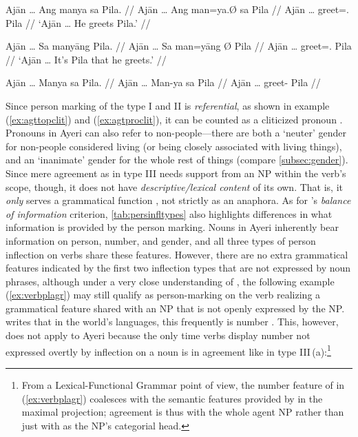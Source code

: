 \pex %
\a\label{ex:agttopclit}\begingl
	\gla Ajān … Ang manya sa Pila. //
	\glb Ajān … Ang man=ya.Ø sa ​Pila //
	\glc Ajān … \AgtT{} greet=\TsgM{}.\Top{} \Parg{} ​Pila //
	\glft `Ajān … He greets Pila.' //
\endgl

\a\label{ex:agtproclit}\begingl
	\gla Ajān … Sa manyāng {} Pila. //
	\glb Ajān … Sa man=yāng Ø Pila //
	\glc Ajān … \PatT{} greet=\TsgM{}.\Aarg{} \Top{} ​Pila //
	\glft `Ajān … It's Pila that he greets.' //
\endgl

\a\label{ex:wrongagr}\ljudge* \begingl
	\gla Ajān … Manya sa Pila. //
	\glb Ajān … Man-ya sa ​Pila //
	\glc Ajān … greet-\TsgM{} \Parg{} ​Pila //
\endgl

\xe

Since person marking of the type I and II is \emph{referential}, as shown in
example (\ref{ex:agttopclit}) and (\ref{ex:agtproclit}), it can be counted as
a cliticized pronoun \citep[103]{corbett2006}. Pronouns in Ayeri can also
refer to non-people---there are both a `neuter' gender for non-people
considered living (or being closely associated with living things), and an
`inanimate' gender for the whole rest of things (compare
\autoref{subsec:gender}). Since mere agreement as in type III needs support
from an NP within the verb's scope, though, it does not have
\emph{descriptive/lexical content} of its own. That is, it \emph{only} serves
a grammatical function \citep[104]{corbett2006}, not strictly as an anaphora.
As for \citet{corbett2006}'s \emph{balance of information} criterion,
\autoref{tab:persinfltypes} also highlights differences in what information is
provided by the person marking. Nouns in Ayeri inherently bear information on
person, number, and gender, and all three types of person inflection on verbs
share these features. However, there are no extra grammatical features
indicated by the first two inflection types that are not expressed by noun
phrases, although under a very close understanding of \citet{corbett2006}, the
following example (\ref{ex:verbplagr}) may still qualify as person-marking on
the verb realizing a grammatical feature shared with an NP that is not openly
expressed by the NP. \citet{corbett2006} writes that in the world's languages, 
this frequently is number \citep[105]{corbett2006}. This, however, does not 
apply to Ayeri because the only time verbs display number not expressed 
overtly by inflection on a noun is in agreement like in type 
III\,(a):\footnote{From a Lexical-Functional Grammar point of view, the number 
feature of  in (\ref{ex:verbplagr}) coalesces with the semantic 
features provided by  in the maximal projection; agreement 
is thus with the whole agent NP rather than just with  as 
the NP's categorial head.}

